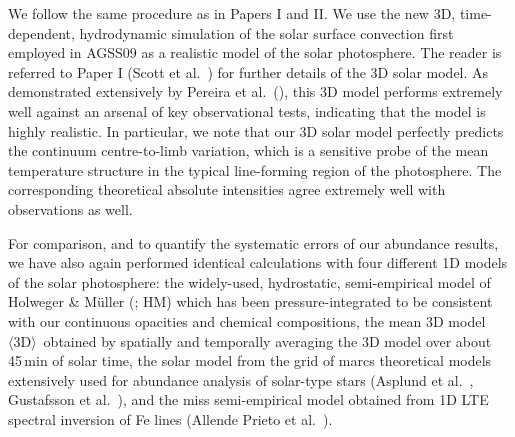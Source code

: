 \documentclass[traditabstract]{aa}
\newcommand{\oneDAV}{$\langle\mathrm{3D}\rangle$}
\begin{document}
We follow the same procedure as in Papers I and II. We use the new 3D, time-dependent, hydrodynamic simulation of the solar surface convection first employed in AGSS09 as a realistic model of the solar photosphere. The reader is referred to Paper I (Scott et al.\ \cite{AGSS_NaCa}) for further details of the 3D solar model. As demonstrated extensively by  Pereira et al.\ (\cite{pereira_models}), this 3D model performs extremely well against an arsenal of key observational tests, indicating that the model is highly realistic. In particular, we note that our 3D solar model perfectly predicts the continuum centre-to-limb variation, which is a sensitive probe of the mean temperature structure in the typical line-forming region of the photosphere. The corresponding theoretical absolute intensities agree extremely well with observations as well. 

For comparison, and to quantify the systematic errors of our abundance results, we have also again performed identical calculations with four different 1D models of the solar photosphere: the widely-used, hydrostatic, semi-empirical model of Holweger \& M\"{u}ller (\cite{hol}; HM) which has been pressure-integrated to be consistent with our continuous opacities and chemical compositions, the mean 3D model \oneDAV\ obtained by spatially and temporally averaging the 3D model over about 45\,min of solar time, the solar model from the grid of {\sc marcs} theoretical models  extensively used for abundance analysis of solar-type stars  (Asplund et al.\ \cite{asp0}, Gustafsson et al.\ \cite{marcs08}), and the {\sc miss} semi-empirical model obtained from 1D LTE spectral inversion of Fe lines (Allende Prieto et al.\ \cite{alle}).  
\end{document}
